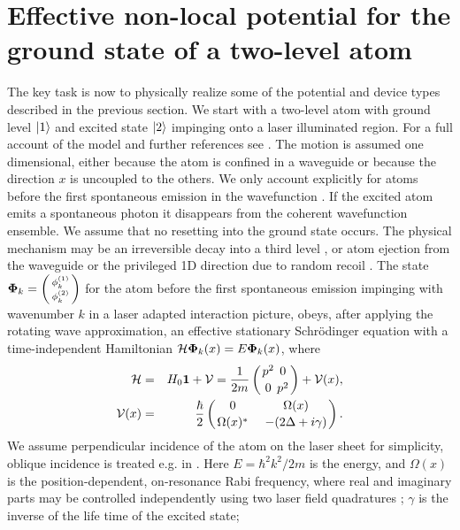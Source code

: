 \section{Effective non-local potential for the ground state of a two-level atom\label{enl}}
%
The key task is now to physically realize some of the potential and device types described in the previous section. We start with a two-level atom with ground level $|1\rangle$ and excited state $|2\rangle$ impinging onto a laser illuminated region. For a full account of the model and further references see
\cite{Ruschhaupt2009}. The motion is assumed one dimensional, either because the atom is confined in a waveguide or because the direction $x$ is uncoupled to
the others.
We only account explicitly for atoms before the first spontaneous emission in the wavefunction
\cite{Hegerfeldt1996,Damborenea2002,Navarro2003}.
If the excited atom emits a spontaneous photon it disappears from the coherent wavefunction ensemble.
We assume that no resetting into the ground state occurs. The physical mechanism
may be an irreversible decay into a third level  \cite{Oberthaler1996}, or atom ejection from the waveguide or the privileged 1D direction due to  random recoil  \cite{Streed2006}.
The state ${\bf\Phi}_k=\left(\begin{smallmatrix}\phi_k^{(1)}\\\phi_k^{(2)}\end{smallmatrix}\right)$
for the atom before the first spontaneous emission impinging with wavenumber $k$
in a laser adapted  interaction picture,
obeys, after applying the rotating wave approximation,  an effective stationary Schr\"odinger equation
with a time-independent Hamiltonian \cite{Ruschhaupt2004a,Ruschhaupt2009}
%
${\cal H}{\bf\Phi}_k(x)=E{\bf\Phi}_k(x)$,
%
where
%
\begin{eqnarray}
	{\cal H}&=& H_0{\bf 1}+ {\cal V}=\frac{1}{2m}\left(
	{{p}^2\atop 0}{0\atop {p}^2}\right)+ {\cal V}(x),
	\\
	{\cal V}(x) &=&
	\frac{\hbar}{2}\left(
	{0\atop \Omega(x)^*}\;\;\;\;
	{\Omega(x)\atop -(2\Delta+i\gamma)}
	\right).
\end{eqnarray}
%
We assume perpendicular incidence of the atom on the laser sheet for simplicity, oblique incidence is treated e.g. in  \cite{Ruschhaupt2007,Ruschhaupt2009}.
Here $E=\hbar^2 k^2/2m$ is the energy, and
$\Omega(x)$ is the position-dependent, on-resonance Rabi frequency, where real and imaginary parts may be controlled independently
using two  laser field quadratures  \cite{Zhang2013};
$\gamma$ is the inverse of the life time of the excited state;
